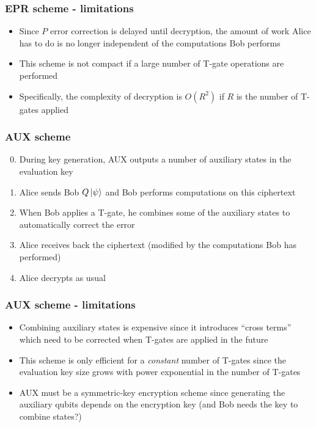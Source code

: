 \begin{frame}
\frametitle{EPR scheme - limitations}
\begin{itemize}
  \item Since $P$ error correction is delayed until decryption, the amount of work Alice has to do is no longer independent of the computations Bob performs
  \item This scheme is not compact if a large number of T-gate operations are performed
  \item Specifically, the complexity of decryption is $O(R^2)$ if $R$ is the number of T-gates applied
  \end{itemize}
\end{frame}
 
 
\begin{frame}
\frametitle{AUX scheme}
\begin{enumerate}
   \setcounter{enumi}{-1}
   \item During key generation, AUX outputs a number of auxiliary states in the evaluation key
   \item Alice sends Bob $Q\left\vert{\psi}\right\rangle$ and Bob performs computations on this ciphertext
   \item When Bob applies a T-gate, he combines some of the auxiliary states to automatically correct the error
   \item Alice receives back the ciphertext (modified by the computations Bob has performed) 
   \item Alice decrypts as usual
\end{enumerate}
\end{frame}
 
\begin{frame}
\frametitle{AUX scheme - limitations}
\begin{itemize}
  \item Combining auxiliary states is expensive since it introduces ``cross terms'' which need to be corrected when T-gates are applied in the future
  \item This scheme is only efficient for a \textit{constant} number of T-gates since the evaluation key size grows with power exponential in the number of T-gates 
  \item AUX must be a symmetric-key encryption scheme since generating the auxiliary qubits depends on the encryption key (and Bob needs the key to combine states?)
\end{itemize}
\end{frame}
 
